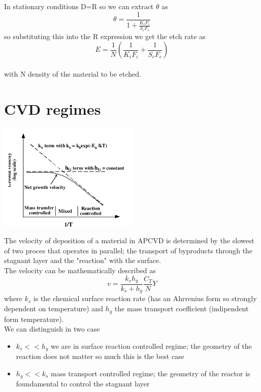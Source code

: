 In stationary conditions D=R so we can extract $\theta$ as
\begin{equation}
\theta=\frac{1}{1+\frac{K_iF_i}{S_cF_c}}
\end{equation}
so substituting this into the R expression we get the etch rate as 
\begin{equation}
E=\frac{1}{N}\left(\frac{1}{K_iF_i}+\frac{1}{S_cF_c}\right)
\end{equation}
\\
with N density of the material to be etched.\\


\section{CVD regimes}

\centering
\includegraphics[width=0.5\textwidth]{CVD.png}\\
\raggedright

The velocity of deposition of a material in APCVD is determined by the slowest of two proces that operates in parallel; the transport of byproducts through the stagnant layer and the "reaction" with the surface.\\
The velocity can be mathematically described as 
\begin{equation}
v=\frac{k_sh_g}{k_s+h_g}\frac{C_T}{N}Y
\end{equation}
where $k_s$ is the chemical surface reaction rate (has an Ahrrenius form so strongly dependent on temperature) and $h_g$ the mass transport coefficient (indipendent form temperature).\\
We can distinguish in two case 
\begin{itemize}
\item $k_s<<h_g$ we are in surface reaction controlled regime; the geometry of the reaction does not matter so much this is the best case
\item $h_g<<k_s$ mass transport controlled regime; the geometry of the reactor is foundamental to control the stagnant layer 
\end{itemize}

